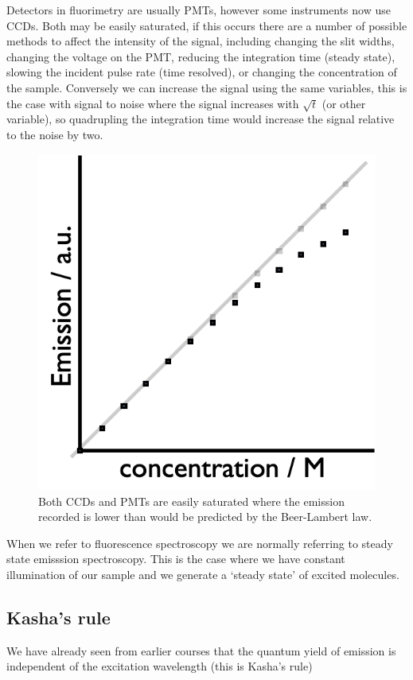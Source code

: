 \documentclass[
]{book}
\begin{document}
Detectors in fluorimetry are usually PMTs, however some instruments now use CCDs. Both may be easily saturated, if this occurs there are a number of possible methods to affect the intensity of the signal, including changing the slit widths, changing the voltage on the PMT, reducing the integration time (steady state), slowing the incident pulse rate (time resolved), or changing the concentration of the sample. Conversely we can increase the signal using the same variables, this is the case with signal to noise where the signal increases with \(\sqrt{t}\) (or other variable), so quadrupling the integration time would increase the signal relative to the noise by two.

\begin{figure}

{\centering \includegraphics[width=0.4\linewidth]{images/saturation} 

}

\caption{Both CCDs and PMTs are easily saturated where the emission recorded is lower than would be predicted by the Beer-Lambert law.}\label{fig:saturation}
\end{figure}

When we refer to fluorescence spectroscopy we are normally referring to steady state emisssion spectroscopy. This is the case where we have constant illumination of our sample and we generate a `steady state' of excited molecules.

\hypertarget{kashas-rule}{%
\subsection{Kasha's rule}\label{kashas-rule}}

We have already seen from earlier courses that the quantum yield of emission is independent of the excitation wavelength (this is Kasha's rule)
\end{document}
